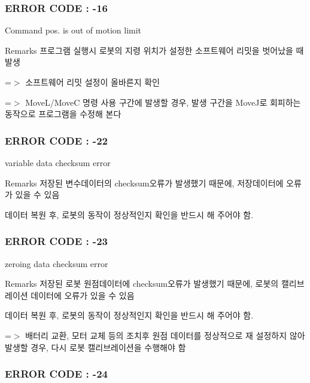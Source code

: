  \subsubsection*{E\-R\-R\-O\-R C\-O\-D\-E \-: -\/16 }

Command pos. is out of motion limit \begin{DoxyRemark}{Remarks}
프로그램 실행시 로봇의 지령 위치가 설정한 소프트웨어 리밋을 벗어났을 때 발생 \par
 =$>$ 소프트웨어 리밋 설정이 올바른지 확인 \par
 =$>$ Move\-L/\-Move\-C 명령 사용 구간에 발생할 경우, 발생 구간을 Move\-J로 회피하는 동작으로 프로그램을 수정해 본다 \par

\end{DoxyRemark}


 \subsubsection*{E\-R\-R\-O\-R C\-O\-D\-E \-: -\/22 }

variable data checksum error \begin{DoxyRemark}{Remarks}
저장된 변수데이터의 checksum오류가 발생했기 때문에, 저장데이터에 오류가 있을 수 있음 \par
 데이터 복원 후, 로봇의 동작이 정상적인지 확인을 반드시 해 주어야 함.
\end{DoxyRemark}


 \subsubsection*{E\-R\-R\-O\-R C\-O\-D\-E \-: -\/23 }

zeroing data checksum error \begin{DoxyRemark}{Remarks}
저장된 로봇 원점데이터에 checksum오류가 발생했기 때문에, 로봇의 캘리브레이션 데이터에 오류가 있을 수 있음 \par
 데이터 복원 후, 로봇의 동작이 정상적인지 확인을 반드시 해 주어야 함.\par
 =$>$ 배터리 교환, 모터 교체 등의 조치후 원점 데이터를 정상적으로 재 설정하지 않아 발생할 경우, 다시 로봇 캘리브레이션을 수행해야 함\par

\end{DoxyRemark}


 \subsubsection*{E\-R\-R\-O\-R C\-O\-D\-E \-: -\/24 }

